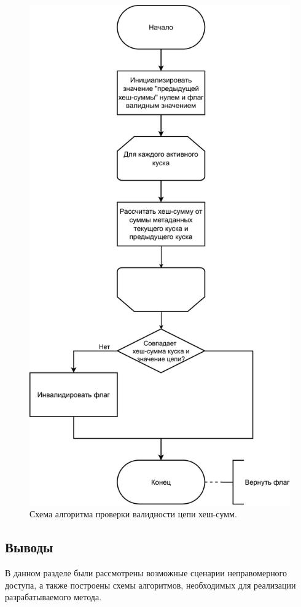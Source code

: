 \pagebreak

\begin{figure}[hbtp]
	\centering
	\includegraphics[scale=0.60]{img/checkalgo.pdf}
	\caption{Схема алгоритма проверки валидности цепи хеш-сумм.}
	\label{fig:checkalgo}
\end{figure}

\pagebreak

\subsection{Выводы}

В данном разделе были рассмотрены возможные сценарии неправомерного доступа, а также построены схемы алгоритмов, необходимых для реализации разрабатываемого метода.

\pagebreak
